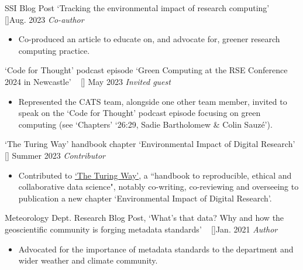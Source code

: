 \begin{talks}
\projecta
	{SSI Blog Post `Tracking the environmental impact of research computing' ~ [\href{https://www.software.ac.uk/blog/tracking-environmental-impact-research-computing}{\small{\websiteSymbol}}]}{Aug. 2023}
	{
	    \textit{Co-author}
	}
	{\begin{itemize}
     \item Co-produced an article to educate on, and advocate for, greener research computing practice.
     \end{itemize}}

\projecta
	{`Code for Thought' podcast episode `Green Computing at the RSE Conference 2024 in Newcastle' ~ [\href{https://codeforthought.buzzsprout.com/1326658/episodes/15766448-en-bonus-green-computing-at-the-rse-conference-2024-in-newcastle}{\small{\websiteSymbol}}]}{\hspace*{16cm} May 2023}
	{
	    \textit{Invited guest}
	}
	{\begin{itemize}
     \item Represented the CATS team, alongside one other team member, invited to speak on the `Code for Thought' podcast episode focusing on green computing (see `Chapters' \rightarrow \hspace{1mm} `26:29, Sadie Bartholomew \& Colin Sauzé').
     \end{itemize}}

\projecta
	{`The Turing Way' handbook chapter `Environmental Impact of Digital Research' [\href{https://book.the-turing-way.org/ethical-research/activism/activism-env-impact.html}{\small{\websiteSymbol}}]
  }{Summer 2023}
	{
	    \textit{Contributor}
	}
	{\begin{itemize}
     \item Contributed to \href{https://book.the-turing-way.org/}{`The Turing Way'}, a ``handbook to reproducible, ethical and collaborative data science", notably co-writing, co-reviewing and overseeing to publication a new chapter `Environmental Impact of Digital Research'.
     \end{itemize}}

\projecta
	{Meteorology Dept. Research Blog Post, `What’s that data? Why and how the geoscientific community is forging metadata standards' ~ [\href{https://blogs.reading.ac.uk/weather-and-climate-at-reading/2021/whats-that-data-why-and-how-the-geoscientific-community-is-forging-metadata-standards/}{\small{\websiteSymbol}}]}{Jan. 2021}
	{
	    \textit{Author}
	}
	{\begin{itemize}
     \item Advocated for the importance of metadata standards to the department and wider weather and climate community. 
     \end{itemize}}

\end{talks}    
\vspace{-3mm}
